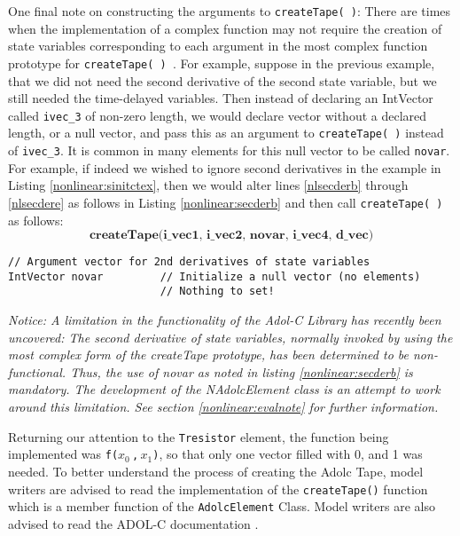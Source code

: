 One final note on constructing the arguments to \texttt{createTape(~)}:
There are times when the implementation of a complex function may not
require the creation of state variables corresponding to each argument
in the most complex function prototype for \texttt{createTape(~) }.
For example, suppose in the previous example, that we did not need
the second derivative of the second state variable, but we still needed
the time-delayed variables.  Then instead of declaring an IntVector
called \texttt{ivec\_3} of non-zero length, we would declare vector
without a declared length, or a null vector, and pass this as an
argument to \texttt{createTape(~)} instead of \texttt{ivec\_3}.  It
is common in many \FDA elements for this null vector to be called
\texttt{novar}.  For example, if indeed we wished to ignore second
derivatives in the example in Listing \ref{nonlinear:sinitctex},
then we would alter lines \ref{nlsecderb} through
\ref{nlsecdere} as follows in Listing \ref{nonlinear:secderb} and
then call \texttt{createTape(~)} as follows:
\newline
\[\textbf{createTape(i\_vec1, i\_vec2, novar, i\_vec4, d\_vec)}\]
\newline
\begin{lstlisting}[firstnumber=14, label={nonlinear:secderb},
    caption={Declaring a null vector argument for createTape(~)}]
// Argument vector for 2nd derivatives of state variables
IntVector novar         // Initialize a null vector (no elements)
                        // Nothing to set!
\end{lstlisting}
\emph{Notice: A limitation in the functionality of the Adol-C
Library has recently been uncovered:  The second derivative
of state variables, normally invoked by using the most complex
form of the createTape prototype, has been determined to be
non-functional.  Thus, the use of novar as noted in listing
\ref{nonlinear:secderb} is mandatory.  The development of the
NAdolcElement class is an attempt to work around this limitation.
See section \ref{nonlinear:evalnote} for further information.}

Returning our attention to the \texttt{Tresistor} element, the function being
implemented was \texttt{f($x_0\,$,$\,x_1$)}, so that only one vector
filled with 0, and 1 was needed.  To better understand
the process of creating the Adolc Tape, model writers are advised to
read the implementation of the \texttt{createTape()} function which is a
member function of the \texttt{AdolcElement} Class.  Model writers
are also advised to read the ADOL-C documentation \cite{adol-c}.

